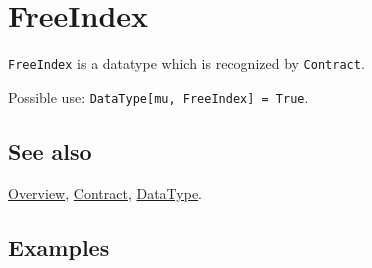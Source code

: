 \documentclass[../FeynCalcManual.tex]{subfiles}
\begin{document}
\hypertarget{freeindex}{%
\section{FreeIndex}\label{freeindex}}

\texttt{FreeIndex} is a datatype which is recognized by
\texttt{Contract}.

Possible use:
\texttt{DataType[\allowbreak{}mu,\ \allowbreak{}FreeIndex] = True}.

\subsection{See also}

\hyperlink{toc}{Overview}, \hyperlink{contract}{Contract},
\hyperlink{datatype}{DataType}.

\subsection{Examples}
\end{document}

